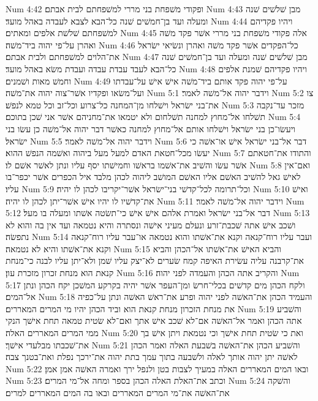 Num 4:42  ופקודי משׁפחת בני מררי למשׁפחתם לבית אבתם׃
Num 4:43  מבן שׁלשׁים שׁנה ומעלה ועד בן־חמשׁים שׁנה כל־הבא לצבא לעבדה באהל מועד׃
Num 4:44  ויהיו פקדיהם למשׁפחתם שׁלשׁת אלפים ומאתים׃
Num 4:45  אלה פקודי משׁפחת בני מררי אשׁר פקד משׁה ואהרן על־פי יהוה ביד־משׁה׃
Num 4:46  כל־הפקדים אשׁר פקד משׁה ואהרן ונשׂיאי ישׂראל את־הלוים למשׁפחתם ולבית אבתם׃
Num 4:47  מבן שׁלשׁים שׁנה ומעלה ועד בן־חמשׁים שׁנה כל־הבא לעבד עבדת עבדה ועבדת משׂא באהל מועד׃
Num 4:48  ויהיו פקדיהם שׁמנת אלפים וחמשׁ מאות ושׁמנים׃
Num 4:49  על־פי יהוה פקד אותם ביד־משׁה אישׁ אישׁ על־עבדתו ועל־משׂאו ופקדיו אשׁר־צוה יהוה את־משׁה׃
Num 5:1  וידבר יהוה אל־משׁה לאמר׃
Num 5:2  צו את־בני ישׂראל וישׁלחו מן־המחנה כל־צרוע וכל־זב וכל טמא לנפשׁ׃
Num 5:3  מזכר עד־נקבה תשׁלחו אל־מחוץ למחנה תשׁלחום ולא יטמאו את־מחניהם אשׁר אני שׁכן בתוכם׃
Num 5:4  ויעשׂו־כן בני ישׂראל וישׁלחו אותם אל־מחוץ למחנה כאשׁר דבר יהוה אל־משׁה כן עשׂו בני ישׂראל׃
Num 5:5  וידבר יהוה אל־משׁה לאמר׃
Num 5:6  דבר אל־בני ישׂראל אישׁ או־אשׁה כי יעשׂו מכל־חטאת האדם למעל מעל ביהוה ואשׁמה הנפשׁ ההוא׃
Num 5:7  והתודו את־חטאתם אשׁר עשׂו והשׁיב את־אשׁמו בראשׁו וחמישׁתו יסף עליו ונתן לאשׁר אשׁם לו׃
Num 5:8  ואם־אין לאישׁ גאל להשׁיב האשׁם אליו האשׁם המושׁב ליהוה לכהן מלבד איל הכפרים אשׁר יכפר־בו עליו׃
Num 5:9  וכל־תרומה לכל־קדשׁי בני־ישׂראל אשׁר־יקריבו לכהן לו יהיה׃
Num 5:10  ואישׁ את־קדשׁיו לו יהיו אישׁ אשׁר־יתן לכהן לו יהיה׃
Num 5:11  וידבר יהוה אל־משׁה לאמר׃
Num 5:12  דבר אל־בני ישׂראל ואמרת אלהם אישׁ אישׁ כי־תשׂטה אשׁתו ומעלה בו מעל׃
Num 5:13  ושׁכב אישׁ אתה שׁכבת־זרע ונעלם מעיני אישׁה ונסתרה והיא נטמאה ועד אין בה והוא לא נתפשׂה׃
Num 5:14  ועבר עליו רוח־קנאה וקנא את־אשׁתו והוא נטמאה או־עבר עליו רוח־קנאה וקנא את־אשׁתו והיא לא נטמאה׃
Num 5:15  והביא האישׁ את־אשׁתו אל־הכהן והביא את־קרבנה עליה עשׂירת האיפה קמח שׂערים לא־יצק עליו שׁמן ולא־יתן עליו לבנה כי־מנחת קנאת הוא מנחת זכרון מזכרת עון׃
Num 5:16  והקריב אתה הכהן והעמדה לפני יהוה׃
Num 5:17  ולקח הכהן מים קדשׁים בכלי־חרשׂ ומן־העפר אשׁר יהיה בקרקע המשׁכן יקח הכהן ונתן אל־המים׃
Num 5:18  והעמיד הכהן את־האשׁה לפני יהוה ופרע את־ראשׁ האשׁה ונתן על־כפיה את מנחת הזכרון מנחת קנאת הוא וביד הכהן יהיו מי המרים המאררים׃
Num 5:19  והשׁביע אתה הכהן ואמר אל־האשׁה אם־לא שׁכב אישׁ אתך ואם־לא שׂטית טמאה תחת אישׁך הנקי ממי המרים המאררים האלה׃
Num 5:20  ואת כי שׂטית תחת אישׁך וכי נטמאת ויתן אישׁ בך את־שׁכבתו מבלעדי אישׁך׃
Num 5:21  והשׁביע הכהן את־האשׁה בשׁבעת האלה ואמר הכהן לאשׁה יתן יהוה אותך לאלה ולשׁבעה בתוך עמך בתת יהוה את־ירכך נפלת ואת־בטנך צבה׃
Num 5:22  ובאו המים המאררים האלה במעיך לצבות בטן ולנפל ירך ואמרה האשׁה אמן אמן׃
Num 5:23  וכתב את־האלת האלה הכהן בספר ומחה אל־מי המרים׃
Num 5:24  והשׁקה את־האשׁה את־מי המרים המאררים ובאו בה המים המאררים למרים׃
